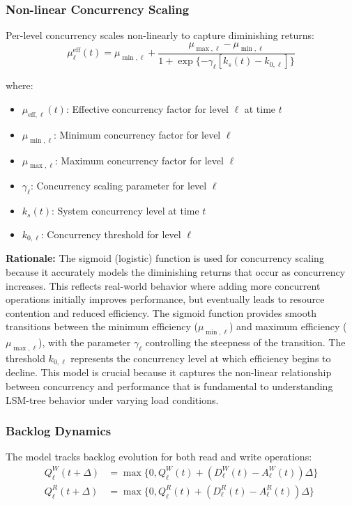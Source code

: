 \documentclass[11pt]{article}
\newcommand{\mueff}{\mu^{\text{eff}}}
\begin{document}
\subsubsection{Non-linear Concurrency Scaling}
Per-level concurrency scales non-linearly to capture diminishing returns:
\begin{equation}
\mueff_\ell(t) = \mu_{\min,\ell} + \frac{\mu_{\max,\ell} - \mu_{\min,\ell}}{1 + \exp\{-\gamma_\ell [k_s(t) - k_{0,\ell}]\}}
\end{equation}

where:
\begin{itemize}
    \item $\mu_{\text{eff},\ell}(t)$: Effective concurrency factor for level $\ell$ at time $t$
    \item $\mu_{\min,\ell}$: Minimum concurrency factor for level $\ell$
    \item $\mu_{\max,\ell}$: Maximum concurrency factor for level $\ell$
    \item $\gamma_\ell$: Concurrency scaling parameter for level $\ell$
    \item $k_s(t)$: System concurrency level at time $t$
    \item $k_{0,\ell}$: Concurrency threshold for level $\ell$
\end{itemize}

\textbf{Rationale:} The sigmoid (logistic) function is used for concurrency scaling because it accurately models the diminishing returns that occur as concurrency increases. This reflects real-world behavior where adding more concurrent operations initially improves performance, but eventually leads to resource contention and reduced efficiency. The sigmoid function provides smooth transitions between the minimum efficiency ($\mu_{\min,\ell}$) and maximum efficiency ($\mu_{\max,\ell}$), with the parameter $\gamma_\ell$ controlling the steepness of the transition. The threshold $k_{0,\ell}$ represents the concurrency level at which efficiency begins to decline. This model is crucial because it captures the non-linear relationship between concurrency and performance that is fundamental to understanding LSM-tree behavior under varying load conditions.

\subsubsection{Backlog Dynamics}
The model tracks backlog evolution for both read and write operations:
\begin{align}
Q^W_\ell(t+\Delta) &= \max\{0, Q^W_\ell(t) + (D^W_\ell(t) - A^W_\ell(t)) \Delta\} \\
Q^R_\ell(t+\Delta) &= \max\{0, Q^R_\ell(t) + (D^R_\ell(t) - A^R_\ell(t)) \Delta\}
\end{align}
\end{document}
